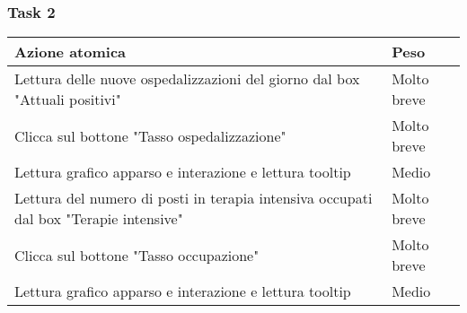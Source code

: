 \subsubsection{Task 2}
\label{sss:iaa-task-2}

{
\renewcommand{\arraystretch}{2}
\begin{longtable}[h]{| p{14cm} | p{2.5cm} |}
    \hline
    \textbf{Azione atomica} & \textbf{Peso} \\
    \hline
    \endhead
    Lettura delle nuove ospedalizzazioni del giorno dal box "Attuali positivi" & Molto breve \\
    \hline
    Clicca sul bottone "Tasso ospedalizzazione" & Molto breve  \\
    \hline
    Lettura grafico apparso e interazione e lettura tooltip & Medio \\
    \hline
    Lettura del numero di posti in terapia intensiva occupati dal box "Terapie intensive" & Molto breve \\
    \hline
    Clicca sul bottone "Tasso occupazione" & Molto breve \\
    \hline
    Lettura grafico apparso e interazione e lettura tooltip & Medio \\
    \hline
\end{longtable}
}
